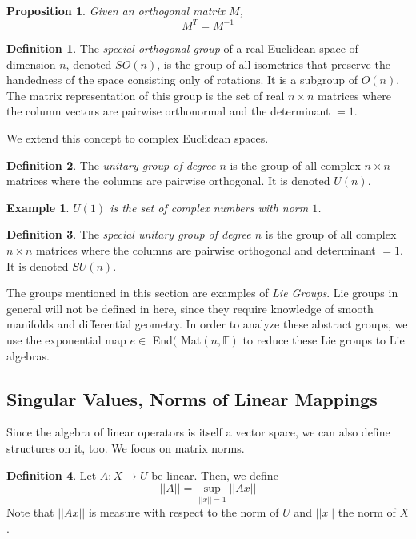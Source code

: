 \documentclass{article}
\newtheorem{proposition}[theorem]{Proposition}
\newtheorem{example}{Example}[section]
\theoremstyle{remark}
\theoremstyle{definition}
\newtheorem{definition}{Definition}[section]
\begin{document}
\begin{proposition}
Given an orthogonal matrix $M$,
\[M^T = M^{-1}\]
\end{proposition}

\begin{definition}
The \textit{special orthogonal group} of a real Euclidean space of dimension $n$, denoted $SO(n)$, is the group of all isometries that preserve the handedness of the space consisting only of rotations. It is a subgroup of $O(n)$. The matrix representation of this group is the set of real $n \times n$ matrices where the column vectors are pairwise orthonormal and the determinant $=1$. 
\end{definition}

We extend this concept to complex Euclidean spaces. 

\begin{definition}
The \textit{unitary group of degree $n$} is the group of all complex $n \times n$ matrices where the columns are pairwise orthogonal. It is denoted $U(n)$. 
\end{definition}

\begin{example}
$U(1)$ is the set of complex numbers with norm $1$. 
\end{example}

\begin{definition}
The \textit{special unitary group of degree $n$} is the group of all complex $n \times n$ matrices where the columns are pairwise orthogonal and determinant $=1$. It is denoted $SU(n)$. 
\end{definition}

The groups mentioned in this section are examples of \textit{Lie Groups}. Lie groups in general will not be defined in here, since they require knowledge of smooth manifolds and differential geometry. In order to analyze these abstract groups, we use the exponential map $e \in$ End$($ Mat$(n, \mathbb{F})$ to reduce these Lie groups to Lie algebras.

\subsection{Singular Values, Norms of Linear Mappings}
Since the algebra of linear operators is itself a vector space, we can also define structures on it, too. We focus on matrix norms. 

\begin{definition}
Let $A: X \longrightarrow U$ be linear. Then, we define
\[||A|| = \sup_{||x||=1} ||A x||\]
Note that $||A x||$ is measure with respect to the norm of $U$ and $||x||$ the norm of $X$. 
\end{definition}
\end{document}
